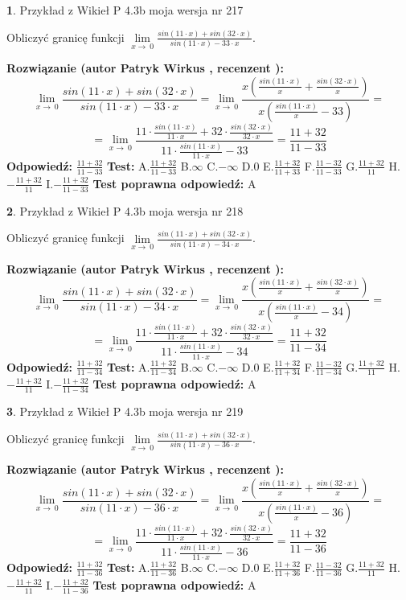 \documentclass[12pt, a4paper]{article}
\theoremstyle{definition} %
\newtheorem{zad}{}
\newcommand{\zadStart}[1]{\begin{zad}#1\newline}
\newcommand{\zadStop}{\end{zad}}
\newcommand{\rozwStart}[2]{\noindent \textbf{Rozwiązanie (autor #1 , recenzent #2): }\newline}
\newcommand{\rozwStop}{\newline}
\newcommand{\odpStart}{\noindent \textbf{Odpowiedź:}\newline}
\newcommand{\odpStop}{\newline}
\newcommand{\testStart}{\noindent \textbf{Test:}\newline}
\newcommand{\testStop}{\newline}
\newcommand{\kluczStart}{\noindent \textbf{Test poprawna odpowiedź:}\newline}
\newcommand{\kluczStop}{\newline}
\begin{document}
\zadStart{Przykład z Wikieł P 4.3b moja wersja nr 217}


Obliczyć granicę funkcji $\lim\limits_{x\to\ 0}\frac{sin(11 \cdot x)+sin(32 \cdot x)}{sin(11 \cdot x)-33 \cdot x}$.
\zadStop
\rozwStart{Patryk Wirkus}{}
$$\lim\limits_{x\to\ 0}\frac{sin(11 \cdot x)+sin(32 \cdot x)}{sin(11 \cdot x)-33 \cdot x}=\lim\limits_{x\to\ 0}\frac{x(\frac{sin(11 \cdot x)}{x}+\frac{sin(32 \cdot x)}{x})}{x(\frac{sin(11 \cdot x)}{x}-33)}=$$
$$=\lim\limits_{x\to\ 0}\frac{11 \cdot \frac{sin(11 \cdot x)}{11 \cdot x}+32 \cdot \frac{sin(32 \cdot x)}{32 \cdot x}}{11 \cdot \frac{sin(11 \cdot x)}{11 \cdot x}-33}=\frac{11+32}{11-33}$$
\rozwStop
\odpStart
$\frac{11+32}{11-33}$
\odpStop
\testStart
A.$\frac{11+32}{11-33}$
B.$\infty$
C.$-\infty$
D.$0$
E.$\frac{11+32}{11+33}$
F.$\frac{11-32}{11-33}$
G.$\frac{11+32}{11}$
H.$-\frac{11+32}{11}$
I.$-\frac{11+32}{11-33}$
\testStop
\kluczStart
A
\kluczStop



\zadStart{Przykład z Wikieł P 4.3b moja wersja nr 218}


Obliczyć granicę funkcji $\lim\limits_{x\to\ 0}\frac{sin(11 \cdot x)+sin(32 \cdot x)}{sin(11 \cdot x)-34 \cdot x}$.
\zadStop
\rozwStart{Patryk Wirkus}{}
$$\lim\limits_{x\to\ 0}\frac{sin(11 \cdot x)+sin(32 \cdot x)}{sin(11 \cdot x)-34 \cdot x}=\lim\limits_{x\to\ 0}\frac{x(\frac{sin(11 \cdot x)}{x}+\frac{sin(32 \cdot x)}{x})}{x(\frac{sin(11 \cdot x)}{x}-34)}=$$
$$=\lim\limits_{x\to\ 0}\frac{11 \cdot \frac{sin(11 \cdot x)}{11 \cdot x}+32 \cdot \frac{sin(32 \cdot x)}{32 \cdot x}}{11 \cdot \frac{sin(11 \cdot x)}{11 \cdot x}-34}=\frac{11+32}{11-34}$$
\rozwStop
\odpStart
$\frac{11+32}{11-34}$
\odpStop
\testStart
A.$\frac{11+32}{11-34}$
B.$\infty$
C.$-\infty$
D.$0$
E.$\frac{11+32}{11+34}$
F.$\frac{11-32}{11-34}$
G.$\frac{11+32}{11}$
H.$-\frac{11+32}{11}$
I.$-\frac{11+32}{11-34}$
\testStop
\kluczStart
A
\kluczStop



\zadStart{Przykład z Wikieł P 4.3b moja wersja nr 219}


Obliczyć granicę funkcji $\lim\limits_{x\to\ 0}\frac{sin(11 \cdot x)+sin(32 \cdot x)}{sin(11 \cdot x)-36 \cdot x}$.
\zadStop
\rozwStart{Patryk Wirkus}{}
$$\lim\limits_{x\to\ 0}\frac{sin(11 \cdot x)+sin(32 \cdot x)}{sin(11 \cdot x)-36 \cdot x}=\lim\limits_{x\to\ 0}\frac{x(\frac{sin(11 \cdot x)}{x}+\frac{sin(32 \cdot x)}{x})}{x(\frac{sin(11 \cdot x)}{x}-36)}=$$
$$=\lim\limits_{x\to\ 0}\frac{11 \cdot \frac{sin(11 \cdot x)}{11 \cdot x}+32 \cdot \frac{sin(32 \cdot x)}{32 \cdot x}}{11 \cdot \frac{sin(11 \cdot x)}{11 \cdot x}-36}=\frac{11+32}{11-36}$$
\rozwStop
\odpStart
$\frac{11+32}{11-36}$
\odpStop
\testStart
A.$\frac{11+32}{11-36}$
B.$\infty$
C.$-\infty$
D.$0$
E.$\frac{11+32}{11+36}$
F.$\frac{11-32}{11-36}$
G.$\frac{11+32}{11}$
H.$-\frac{11+32}{11}$
I.$-\frac{11+32}{11-36}$
\testStop
\kluczStart
A
\kluczStop
\end{document}
